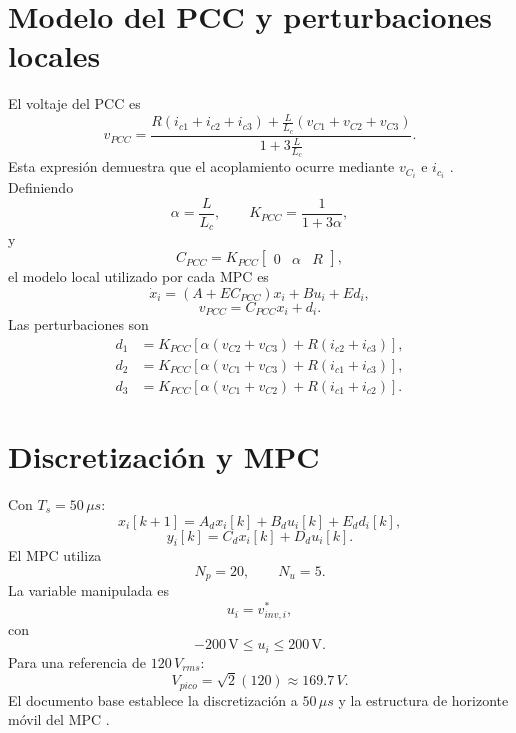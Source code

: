 \documentclass[12pt,a4paper]{article}
\begin{document}
\section{Modelo del PCC y perturbaciones locales}
El voltaje del PCC es
\begin{equation}
v_{PCC}=\frac{R(i_{c1}+i_{c2}+i_{c3})+\frac{L}{L_c}(v_{C1}+v_{C2}+v_{C3})}{1+3\frac{L}{L_c}}.
\end{equation}
Esta expresión demuestra que el acoplamiento ocurre mediante $v_{C_i}$ e $i_{c_i}$ \cite{tesis}. Definiendo
\begin{equation}
\alpha=\frac{L}{L_c},\qquad K_{PCC}=\frac{1}{1+3\alpha},
\end{equation}
y
\begin{equation}
C_{PCC}=K_{PCC}\begin{bmatrix}0&\alpha&R\end{bmatrix},
\end{equation}
el modelo local utilizado por cada MPC es
\begin{equation}
\dot{x}_i=(A+EC_{PCC})x_i+Bu_i+Ed_i,
\end{equation}
\begin{equation}
v_{PCC}=C_{PCC}x_i+d_i.
\end{equation}
Las perturbaciones son
\begin{align}
d_1&=K_{PCC}[\alpha(v_{C2}+v_{C3})+R(i_{c2}+i_{c3})],\\
d_2&=K_{PCC}[\alpha(v_{C1}+v_{C3})+R(i_{c1}+i_{c3})],\\
d_3&=K_{PCC}[\alpha(v_{C1}+v_{C2})+R(i_{c1}+i_{c2})].
\end{align}

\section{Discretización y MPC}
Con $T_s=50\,\mu s$:
\begin{equation}
x_i[k+1]=A_dx_i[k]+B_du_i[k]+E_dd_i[k],
\end{equation}
\begin{equation}
y_i[k]=C_dx_i[k]+D_du_i[k].
\end{equation}
El MPC utiliza
\begin{equation}
N_p=20,\qquad N_u=5.
\end{equation}
La variable manipulada es
\begin{equation}
u_i=v_{inv,i}^{*},
\end{equation}
con
\begin{equation}
-200\,\mathrm{V}\leq u_i\leq200\,\mathrm{V}.
\end{equation}
Para una referencia de $120\,V_{rms}$:
\begin{equation}
V_{pico}=\sqrt{2}(120)\approx169.7\,V.
\end{equation}
El documento base establece la discretización a $50\,\mu s$ y la estructura de horizonte móvil del MPC \cite{tesis}.
\end{document}
